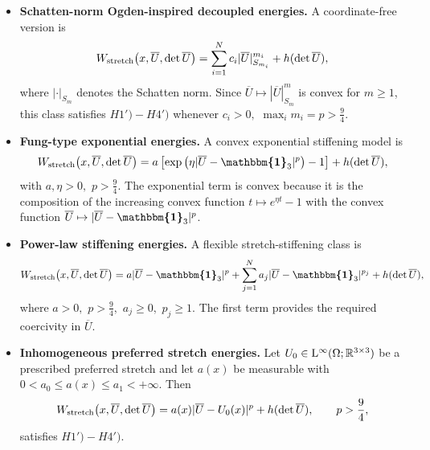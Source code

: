 \documentclass[11pt]{article}
\newcommand{\id}{{\boldsymbol{\mathbbm{1}}}}
\begin{document}
\begin{footnotesize}
\begin{itemize}
\item \textbf{Schatten-norm Ogden-inspired decoupled energies.}
A coordinate-free  version is
\begin{align}
        W_{\rm stretch}\bigl(x,\overline U,\det \overline U\bigr)
        =
        \sum_{i=1}^N c_i  | \overline U | _{S_{m_i}}^{m_i}
        +
        h(\det \overline U),
\end{align}
where $ | \cdot | _{S_m}$ denotes the Schatten norm. Since
$
        \overline U\mapsto  |\overline  U | _{S_m}^{m}
$
is convex for $m\geq1$, this class satisfies $H1')-H4')$ whenever
$
        c_i>0,
         $ $
        \max_i m_i=p>\frac{9}{4}.
$

\item \textbf{Fung-type exponential  energies.}
A convex exponential stiffening model is
\begin{align}
        W_{\rm stretch}\bigl(x,\overline U,\det \overline U\bigr)
        =
        a\left[
        \exp\left(\eta | \overline U-\id_3 | ^p\right)-1
        \right]
        +
        h(\det\overline  U),
\end{align}
with
$
        a,\eta>0,
           $ $
        p>\frac{9}{4}.
$
The exponential term is convex because it is the composition of the increasing
convex function $t\mapsto e^{\eta t}-1$ with the convex function
$\overline U\mapsto |\overline U-\id_3|^p$.

\item \textbf{Power-law stiffening energies.}
A flexible stretch-stiffening class is
\begin{align}
        W_{\rm stretch}\bigl(x,\overline U,\det \overline U\bigr)
        =
        a | \overline U-\id_3 | ^p
        +
        \sum_{j=1}^N a_j  | \overline U-\id_3 | ^{p_j}
        +
        h(\det\overline  U),
\end{align}
where
$
        a>0,
            $ $
        p>\frac{9}{4},
       $ $
        a_j\geq0,
         $ $
        p_j\geq1.
$
The first term provides the required coercivity in $\overline U$.

\item \textbf{Inhomogeneous preferred stretch energies.}
Let
$
        U_0\in {\rm L}^\infty(\Omega;\mathbb R^{3\times3})
$
be a prescribed preferred stretch and let $a(x)$ be measurable with
$
        0<a_0\leq a(x)\leq a_1<+\infty .
$
Then
\begin{align}
        W_{\rm stretch}\bigl(x,\overline U,\det \overline U\bigr)
        =
        a(x) | \overline U-U_0(x) | ^p
        +
        h(\det \overline U),
        \qquad
        p>\frac{9}{4},
\end{align}
satisfies $H1')-H4')$.


\end{itemize}
\end{footnotesize}
\end{document}

